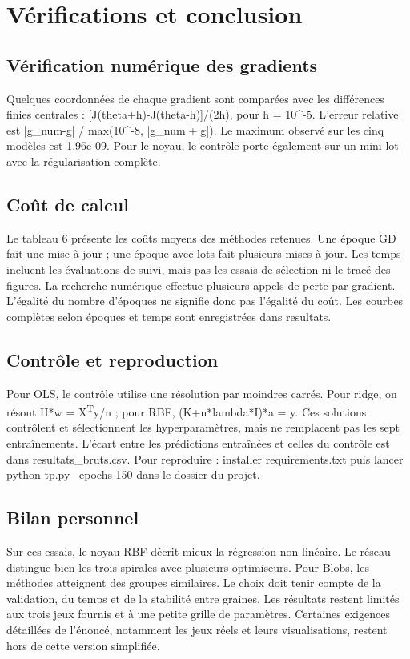 \documentclass[10pt,a4paper]{article}
\begin{document}
\newpage
\section*{Vérifications et conclusion}
\subsection*{Vérification numérique des gradients}
Quelques coordonnées de chaque gradient sont comparées avec les différences finies centrales : [J(theta+h)-J(theta-h)]/(2h), pour h = 10\textasciicircum{}-5. L’erreur relative est |g\_num-g| / max(10\textasciicircum{}-8, |g\_num|+|g|). Le maximum observé sur les cinq modèles est 1.96e-09. Pour le noyau, le contrôle porte également sur un mini-lot avec la régularisation complète.

\subsection*{Coût de calcul}
Le tableau 6 présente les coûts moyens des méthodes retenues. Une époque GD fait une mise à jour ; une époque avec lots fait plusieurs mises à jour. Les temps incluent les évaluations de suivi, mais pas les essais de sélection ni le tracé des figures. La recherche numérique effectue plusieurs appels de perte par gradient. L’égalité du nombre d’époques ne signifie donc pas l’égalité du coût. Les courbes complètes selon époques et temps sont enregistrées dans resultats.

\subsection*{Contrôle et reproduction}
Pour OLS, le contrôle utilise une résolution par moindres carrés. Pour ridge, on résout H*w = X\textsuperscript{T}y/n ; pour RBF, (K+n*lambda*I)*a = y. Ces solutions contrôlent et sélectionnent les hyperparamètres, mais ne remplacent pas les sept entraînements. L’écart entre les prédictions entraînées et celles du contrôle est dans resultats\_bruts.csv. Pour reproduire : installer requirements.txt puis lancer python tp.py --epochs 150 dans le dossier du projet.

\subsection*{Bilan personnel}
Sur ces essais, le noyau RBF décrit mieux la régression non linéaire. Le réseau distingue bien les trois spirales avec plusieurs optimiseurs. Pour Blobs, les méthodes atteignent des groupes similaires. Le choix doit tenir compte de la validation, du temps et de la stabilité entre graines. Les résultats restent limités aux trois jeux fournis et à une petite grille de paramètres. Certaines exigences détaillées de l’énoncé, notamment les jeux réels et leurs visualisations, restent hors de cette version simplifiée.
\end{document}
